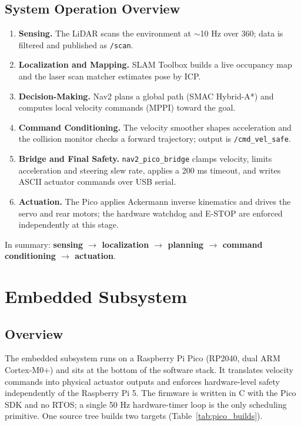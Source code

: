 \documentclass[12pt,a4paper]{report}
\begin{document}
\section{System Operation Overview}

\begin{enumerate}[label=\textbf{Step \arabic*:}, leftmargin=2.5cm]
    \item \textbf{Sensing.} The LiDAR scans the environment at $\sim$10 Hz over
          360\textdegree{}; data is filtered and published as \texttt{/scan}.
    \item \textbf{Localization and Mapping.} SLAM Toolbox builds a live occupancy
          map and the laser scan matcher estimates pose by ICP.
    \item \textbf{Decision-Making.} Nav2 plans a global path (SMAC Hybrid-A*) and
          computes local velocity commands (MPPI) toward the goal.
    \item \textbf{Command Conditioning.} The velocity smoother shapes acceleration
          and the collision monitor checks a forward trajectory; output is
          \texttt{/cmd\_vel\_safe}.
    \item \textbf{Bridge and Final Safety.} \texttt{nav2\_pico\_bridge} clamps
          velocity, limits acceleration and steering slew rate, applies a 200 ms
          timeout, and writes ASCII actuator commands over USB serial.
    \item \textbf{Actuation.} The Pico applies Ackermann inverse kinematics and
          drives the servo and rear motors; the hardware watchdog and E-STOP are
          enforced independently at this stage.
\end{enumerate}

\noindent In summary: \textbf{sensing $\rightarrow$ localization $\rightarrow$
planning $\rightarrow$ command conditioning $\rightarrow$ actuation}.

\chapter{Embedded Subsystem}
\label{ch:embedded}

\section{Overview}

The embedded subsystem runs on a Raspberry Pi Pico (RP2040, dual ARM
Cortex-M0+) and sits at the bottom of the software stack. It translates velocity
commands into physical actuator outputs and enforces hardware-level safety
independently of the Raspberry Pi 5. The firmware is written in C with the Pico
SDK and no RTOS; a single 50 Hz hardware-timer loop is the only scheduling
primitive. One source tree builds two targets (Table~\ref{tab:pico_builds}).
\end{document}
